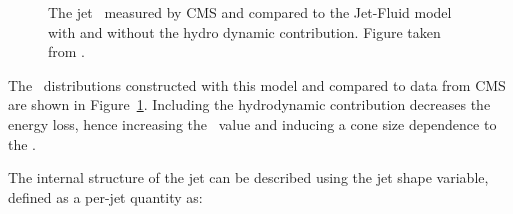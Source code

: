 \begin{figure}
\begin{center}
\begin{minipage}[b]{0.43\textwidth}
\caption{The jet \RAA\ measured by CMS \cite{Khachatryan:2016jfl} and compared to the Jet-Fluid model with and without the hydro dynamic contribution.
Figure taken from \cite{Tachibana:2017syd}.}
\label{fig:jf_raa}
  \end{minipage}
  \end{center}
\end{figure}




The \RAA\ distributions constructed with this model and compared to data from CMS \cite{Khachatryan:2016jfl} are shown in Figure~\ref{fig:jf_raa}.
Including the hydrodynamic contribution decreases the energy loss, hence increasing the \RAA\ value and inducing a cone size dependence to the \RAA.


The internal structure of the jet can be described using the jet shape variable, defined as a per-jet quantity as:


